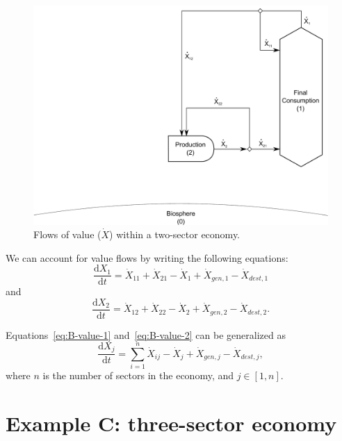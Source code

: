 \begin{landscape}
\begin{figure}[!ht]
\centering
\includegraphics[width=0.8\linewidth]{Part_2/Chapter_Values/images/2_sector_value.pdf}
\caption[Flows of value within a two-sector economy]{Flows of value ($\dot{X}$) within a two-sector economy.}
\label{fig:B_value}
\end{figure}
\end{landscape}

We can account for value flows by writing
the following equations:
%
\begin{equation}\label{eq:B-value-1}
	\frac{\mathrm{d}X_{1}}{\mathrm{d}t}
	= \dot{X}_{11}
	+ \dot{X}_{21}
	- \dot{X}_{1}
	+ \dot{X}_{gen,1}
	- \dot{X}_{dest,1}
\end{equation}
%
and
%
\begin{equation}\label{eq:B-value-2}
	\frac{\mathrm{d}X_{2}}{\mathrm{d}t}
	= \dot{X}_{12}
	+ \dot{X}_{22}
	- \dot{X}_{2}
	+ \dot{X}_{gen,2}
	- \dot{X}_{dest,2}.
\end{equation}

Equations~\ref{eq:B-value-1} and~\ref{eq:B-value-2}
can be generalized as
%
\begin{equation}\label{eq:B-value-generalized}
	\frac{\mathrm{d}X_{j}}{\mathrm{d}t}
	= \sum\limits_{i=1}^n \dot{X}_{ij}
	- \dot{X}_{j}
	+ \dot{X}_{gen,j}
	- \dot{X}_{dest,j},
\end{equation}
%
where $n$ is the number of sectors in the economy, and $j \in [1, n]$.


\section{Example C: three-sector economy} %
\label{sec:value_example_C}

